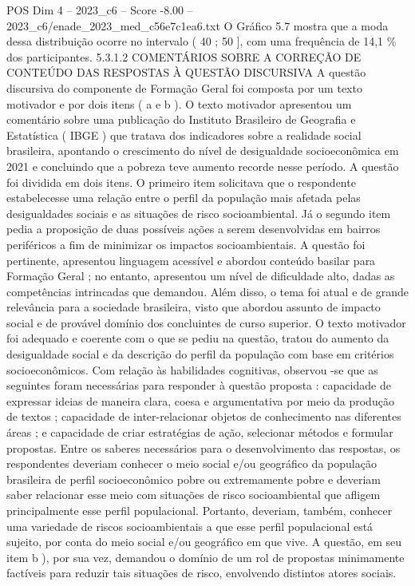 \begin{textsample}{POS Dim 4 – 2023\_c6 – Score -8.00 – 2023\_c6/enade\_2023\_med\_c56e7c1ea6.txt}
O Gráfico 5.7 mostra que a moda dessa distribuição ocorre no intervalo ( 40 ; 50 ], com uma frequência de 14,1 \% dos participantes. 5.3.1.2 COMENTÁRIOS SOBRE A CORREÇÃO DE CONTEÚDO DAS RESPOSTAS À QUESTÃO DISCURSIVA A questão discursiva do componente de Formação Geral foi composta por um texto motivador e por dois itens ( a e b ).
O texto motivador apresentou um comentário sobre uma publicação do Instituto Brasileiro de Geografia e Estatística ( IBGE ) que tratava dos indicadores sobre a realidade social brasileira, apontando o crescimento do nível de desigualdade socioeconômica em 2021 e concluindo que a pobreza teve aumento recorde nesse período.
A questão foi dividida em dois itens.
O primeiro item solicitava que o respondente estabelecesse uma relação entre o perfil da população mais afetada pelas desigualdades sociais e as situações de risco socioambiental.
Já o segundo item pedia a proposição de duas possíveis ações a serem desenvolvidas em bairros periféricos a fim de minimizar os impactos socioambientais.
A questão foi pertinente, apresentou linguagem acessível e abordou conteúdo basilar para Formação Geral ; no entanto, apresentou um nível de dificuldade alto, dadas as competências intrincadas que demandou.
Além disso, o tema foi atual e de grande relevância para a sociedade brasileira, visto que abordou assunto de impacto social e de provável domínio dos concluintes de curso superior.
O texto motivador foi adequado e coerente com o que se pediu na questão, tratou do aumento da desigualdade social e da descrição do perfil da população com base em critérios socioeconômicos.
Com relação às habilidades cognitivas, observou -se que as seguintes foram necessárias para responder à questão proposta : capacidade de expressar ideias de maneira clara, coesa e argumentativa por meio da produção de textos ; capacidade de inter-relacionar objetos de conhecimento nas diferentes áreas ; e capacidade de criar estratégias de ação, selecionar métodos e formular propostas.
Entre os saberes necessários para o desenvolvimento das respostas, os respondentes deveriam conhecer o meio social e/ou geográfico da população brasileira de perfil socioeconômico pobre ou extremamente pobre e deveriam saber relacionar esse meio com situações de risco socioambiental que afligem principalmente esse perfil populacional.
Portanto, deveriam, também, conhecer uma variedade de riscos socioambientais a que esse perfil populacional está sujeito, por conta do meio social e/ou geográfico em que vive.
A questão, em seu item b ), por sua vez, demandou o domínio de um rol de propostas minimamente factíveis para reduzir tais situações de risco, envolvendo distintos atores sociais.

\end{textsample}
